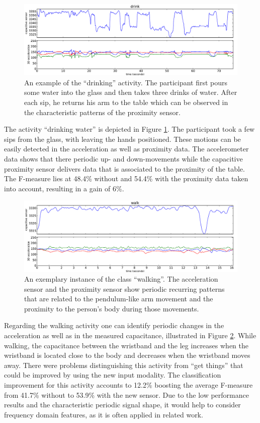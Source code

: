 \documentclass[runningheads,a4paper]{llncs}
\begin{document}
\begin{figure}[t]
	\centering
		\includegraphics[width=\textwidth]{../Auswertung/images/eugen_7.pdf}
	\caption{An example of the ``drinking'' activity. The participant first pours some water into the glass and then takes three drinks of water. After each sip, he returns his arm to the table which can be observed in the characteristic patterns of the proximity sensor.}
	\label{fig:drinking}
\end{figure}

The activity ``drinking water'' is depicted in Figure \ref{fig:drinking}. The participant took a few sips from the glass, with leaving the hands positioned. These motions can be easily detected in the acceleration as well as proximity data. The accelerometer data shows that there periodic up- and down-movements while the capacitive proximity sensor delivers data that is associated to the proximity of the table. The F-measure lies at 48.4\% without and 54.4\% with the proximity data taken into account, resulting in a gain of 6\%.

\begin{figure}
	\centering
		\includegraphics[width=1.00\textwidth]{../Auswertung/images/marko_8.pdf}
	\caption{An exemplary instance of the class ``walking''. The acceleration sensor and the proximity sensor show periodic recurring patterns that are related to the pendulum-like arm movement and the proximity to the person's body during those movements.}
	\label{fig:walking}
\end{figure}

Regarding the walking activity one can identify periodic changes in the acceleration as well as in the measured capacitance, illustrated in Figure \ref{fig:walking}. While walking, the capacitance between the wristband and the leg increases when the wristband is located close to the body and decreases when the wristband moves away. There were problems distinguishing this activity from ``get things'' that could be improved by using the new input modality. The classification improvement for this activity accounts to 12.2\% boosting the average F-measure from 41.7\% without to 53.9\% with the new sensor. Due to the low performance results and the characteristic periodic signal shape, it would help to consider frequency domain features, as it is often applied in related work.
\end{document}
